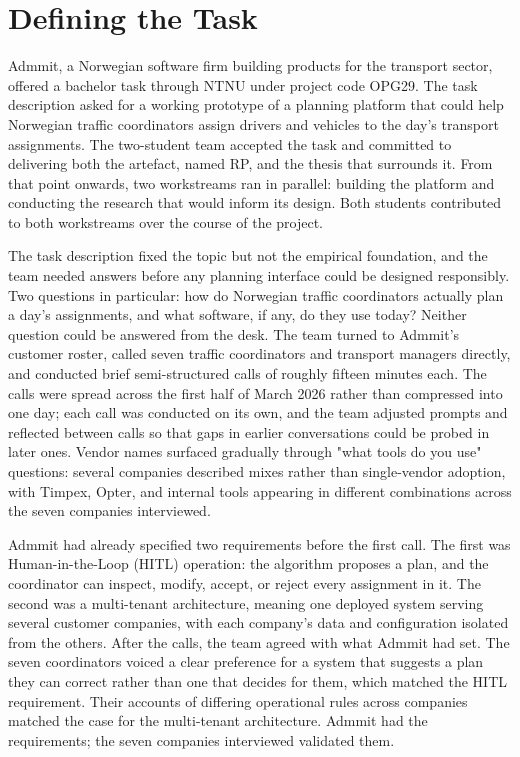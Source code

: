 \section{Defining the Task}
\label{sec:defining-task}

Admmit, a Norwegian software firm building products for the transport sector, offered a bachelor task through NTNU under project code OPG29. The task description asked for a working prototype of a planning platform that could help Norwegian traffic coordinators assign drivers and vehicles to the day's transport assignments. The two-student team accepted the task and committed to delivering both the artefact, named RP, and the thesis that surrounds it. From that point onwards, two workstreams ran in parallel: building the platform and conducting the research that would inform its design. Both students contributed to both workstreams over the course of the project.

The task description fixed the topic but not the empirical foundation, and the team needed answers before any planning interface could be designed responsibly. Two questions in particular: how do Norwegian traffic coordinators actually plan a day's assignments, and what software, if any, do they use today? Neither question could be answered from the desk. The team turned to Admmit's customer roster, called seven traffic coordinators and transport managers directly, and conducted brief semi-structured calls of roughly fifteen minutes each. The calls were spread across the first half of March 2026 rather than compressed into one day; each call was conducted on its own, and the team adjusted prompts and reflected between calls so that gaps in earlier conversations could be probed in later ones. Vendor names surfaced gradually through "what tools do you use" questions: several companies described mixes rather than single-vendor adoption, with Timpex, Opter, and internal tools appearing in different combinations across the seven companies interviewed.

Admmit had already specified two requirements before the first call. The first was Human-in-the-Loop (HITL) operation: the algorithm proposes a plan, and the coordinator can inspect, modify, accept, or reject every assignment in it. The second was a multi-tenant architecture, meaning one deployed system serving several customer companies, with each company's data and configuration isolated from the others. After the calls, the team agreed with what Admmit had set. The seven coordinators voiced a clear preference for a system that suggests a plan they can correct rather than one that decides for them, which matched the HITL requirement. Their accounts of differing operational rules across companies matched the case for the multi-tenant architecture. Admmit had the requirements; the seven companies interviewed validated them.



